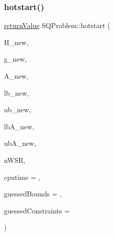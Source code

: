 \subsubsection{\texorpdfstring{hotstart()}{hotstart()}\hspace{0.1cm}{\footnotesize\ttfamily [1/5]}}
{\footnotesize\ttfamily \hyperlink{_message_handling_8hpp_a81d556f613bfbabd0b1f9488c0fa865e}{return\+Value} S\+Q\+Problem\+::hotstart (\begin{DoxyParamCaption}\item[{\hyperlink{class_symmetric_matrix}{Symmetric\+Matrix} $\ast$}]{H\+\_\+new,  }\item[{const \hyperlink{qp_o_a_s_e_s__wrapper_8h_a0d00e2b3dfadee81331bbb39068570c4}{real\+\_\+t} $\ast$const}]{g\+\_\+new,  }\item[{\hyperlink{class_matrix}{Matrix} $\ast$}]{A\+\_\+new,  }\item[{const \hyperlink{qp_o_a_s_e_s__wrapper_8h_a0d00e2b3dfadee81331bbb39068570c4}{real\+\_\+t} $\ast$const}]{lb\+\_\+new,  }\item[{const \hyperlink{qp_o_a_s_e_s__wrapper_8h_a0d00e2b3dfadee81331bbb39068570c4}{real\+\_\+t} $\ast$const}]{ub\+\_\+new,  }\item[{const \hyperlink{qp_o_a_s_e_s__wrapper_8h_a0d00e2b3dfadee81331bbb39068570c4}{real\+\_\+t} $\ast$const}]{lb\+A\+\_\+new,  }\item[{const \hyperlink{qp_o_a_s_e_s__wrapper_8h_a0d00e2b3dfadee81331bbb39068570c4}{real\+\_\+t} $\ast$const}]{ub\+A\+\_\+new,  }\item[{\hyperlink{_types_8hpp_ab6fd6105e64ed14a0c9281326f05e623}{int\+\_\+t} \&}]{n\+W\+SR,  }\item[{\hyperlink{qp_o_a_s_e_s__wrapper_8h_a0d00e2b3dfadee81331bbb39068570c4}{real\+\_\+t} $\ast$const}]{cputime = {},  }\item[{const \hyperlink{class_bounds}{Bounds} $\ast$const}]{guessed\+Bounds = {},  }\item[{const \hyperlink{class_constraints}{Constraints} $\ast$const}]{guessed\+Constraints = {} }\end{DoxyParamCaption})}

